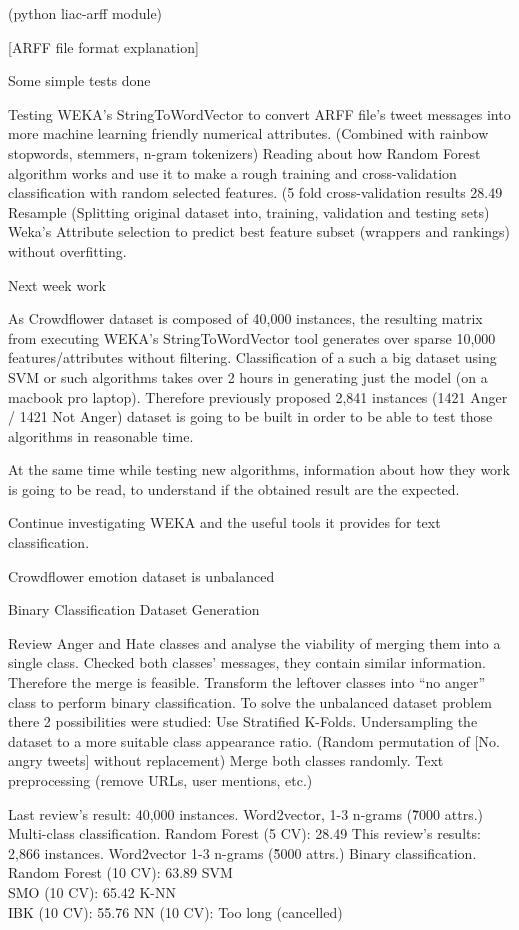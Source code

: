 (python liac-arff module)

[ARFF file format explanation]

Some simple tests done

Testing WEKA's StringToWordVector to convert ARFF file's tweet messages into more machine learning friendly numerical attributes. (Combined with rainbow stopwords, stemmers, n-gram tokenizers)
Reading about how Random Forest algorithm works and use it to make a rough training and cross-validation classification with random selected features. (5 fold cross-validation results 28.49%
Resample (Splitting original dataset into, training, validation and testing sets)
Weka's Attribute selection to predict best feature subset (wrappers and rankings) without overfitting.

Next week work

As Crowdflower dataset is composed of 40,000 instances, the resulting matrix from executing WEKA's StringToWordVector tool generates over sparse 10,000 features/attributes without filtering.
Classification of a such a big dataset using SVM or such algorithms takes over 2 hours in generating just the model (on a macbook pro laptop).
Therefore previously proposed 2,841 instances (1421 Anger / 1421 Not Anger) dataset is going to be built in order to be able to test those algorithms in reasonable time.

At the same time while testing new algorithms, information about how they work is going to be read, to understand if the obtained result are the expected.

Continue investigating WEKA and the useful tools it provides for text classification.

Crowdflower emotion dataset is unbalanced

Binary Classification Dataset Generation

Review  Anger and Hate classes and analyse the viability of merging them into a single class.
Checked both classes’ messages, they contain similar information. Therefore the merge is feasible.
Transform the leftover classes into “no anger” class to perform binary classification.
To solve the unbalanced dataset problem there 2 possibilities were studied: 
Use Stratified K-Folds. 
Undersampling the dataset to a more suitable class appearance ratio. (Random permutation of [No. angry tweets] without replacement)
Merge both classes randomly.
Text preprocessing (remove URLs, user mentions, etc.)

Last review’s result:
40,000 instances.
Word2vector, 1-3 n-grams\cite{cavnar1994n} (\~7000 attrs.)
Multi-class classification.
Random Forest (5 CV): 28.49%
This review’s results:
2,866 instances.
Word2vector 1-3 n-grams (\~5000 attrs.)
Binary classification.
Random Forest (10 CV): 63.89%
SVM\\SMO (10 CV): 65.42%
K-NN\\IBK (10 CV): 55.76%
NN (10 CV): Too long (cancelled)

